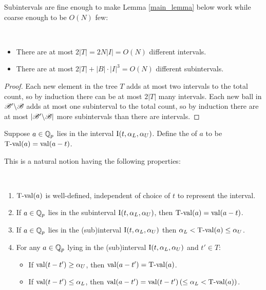 \documentclass{amsart}
\begin{document}


Subintervals are fine enough to make Lemma \ref{main_lemma} below work while coarse enough to be $O(N)$ few:
\begin{Lemma} \label{interval_count}\ 
  \begin{itemize}
  \item 
    There are at most $2|T| = 2 N |I| = O(N)$ different intervals.
  \item 
    There are at most $2|T| + |B| \cdot |I|^3 = O(N)$ different subintervals.
  \end{itemize}
\end{Lemma}

\begin{proof}
  Each new element in the tree $T$ adds at most two intervals to the total count,
  so by induction there can be at most $2|T|$ many intervals.
  Each new ball in $\mathscr B' \backslash \mathscr B$ adds at most one subinterval to the total count,
  so by induction there are at most $|\mathscr B' \backslash \mathscr B|$ more subintervals than there are intervals.
\end{proof}


\begin{Definition}
  Suppose $a \in \mathbb{Q}_p$ lies in the interval $\operatorname{I}(t, \alpha_L, \alpha_U)$. 
  Define the  of $a$ to be $\operatorname{T-val}(a) = \operatorname{val}(a - t)$.    
\end{Definition}

This is a natural notion having the following properties:
\begin{Lemma}  \label{tval} \ 
  \begin{enumerate}[label=(\alph*)]
  \item $\operatorname{T-val}(a)$ is well-defined, independent of choice of $t$ to represent the interval.
  \item If $a \in \mathbb{Q}_p$ lies in the subinterval $\operatorname{I}(t, \alpha_L, \alpha_U)$,
    then $\operatorname{T-val}(a) = \operatorname{val}(a - t)$.
  \item If $a \in \mathbb{Q}_p$ lies in the (sub)interval $\operatorname{I}(t, \alpha_L, \alpha_U)$ 
    then $\alpha_L < \operatorname{T-val}(a) \leq \alpha_U$.
  \item For any $a \in \mathbb{Q}_p$ lying in the (sub)interval $\operatorname{I}(t, \alpha_L, \alpha_U)$ and $t' \in T$:
    \begin{itemize}
    \item If $\operatorname{val}(t - t') \geq \alpha_U$, then $\operatorname{val}(a - t') = \operatorname{T-val}(a)$. 
    \item If $\operatorname{val}(t - t') \leq \alpha_L$, then $\operatorname{val}(a - t') = \operatorname{val}(t - t') \left(\leq \alpha_L < \operatorname{T-val}(a)\right)$. 
    \end{itemize}
  \end{enumerate}
\end{Lemma}
\end{document}

